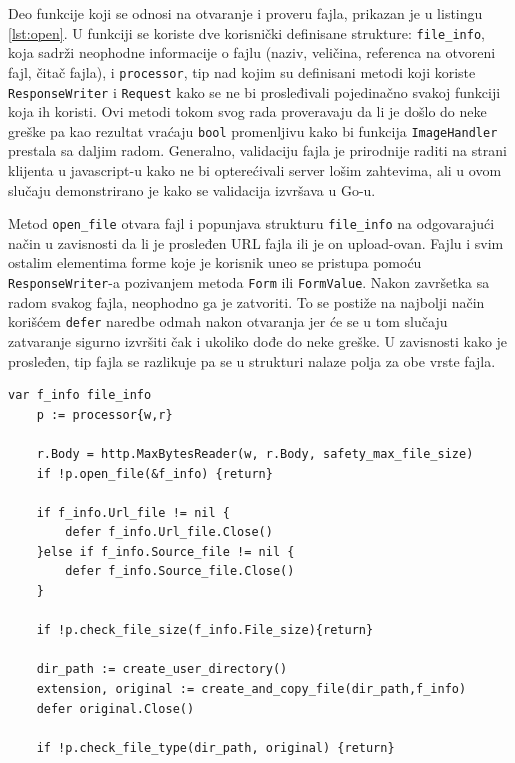 \documentclass[12pt,oneside]{memoir}
\begin{document}
Deo funkcije koji se odnosi na otvaranje i proveru fajla, prikazan je u listingu \ref{lst:open}. U funkciji se koriste dve korisnički definisane strukture: \texttt{file\_info}, koja sadrži neophodne informacije o fajlu (naziv, veličina, referenca na otvoreni fajl, čitač fajla), i \texttt{processor}, tip nad kojim su definisani metodi koji koriste \texttt{ResponseWriter} i \texttt{Request} kako se ne bi prosleđivali pojedinačno svakoj funkciji koja ih koristi. Ovi metodi tokom svog rada proveravaju da li je došlo do neke greške pa kao rezultat vraćaju \texttt{bool} promenljivu kako bi funkcija \texttt{ImageHandler} prestala sa daljim radom. Generalno, validaciju fajla je prirodnije raditi na strani klijenta u javascript-u kako ne bi opterećivali server lošim zahtevima, ali u ovom slučaju demonstrirano je kako se validacija izvršava u Go-u.

Metod \texttt{open\_file} otvara fajl i popunjava strukturu \texttt{file\_info} na odgovarajući način u zavisnosti da li je prosleđen URL fajla ili je on upload-ovan. Fajlu i svim ostalim elementima forme koje je korisnik uneo se pristupa pomoću \texttt{ResponseWriter}-a pozivanjem metoda \texttt{Form} ili \texttt{FormValue}. Nakon završetka sa radom svakog fajla, neophodno ga je zatvoriti. To se postiže na najbolji način korišćem \texttt{defer} naredbe odmah nakon otvaranja jer će se u tom slučaju zatvaranje sigurno izvršiti čak i ukoliko dođe do neke greške. U zavisnosti kako je prosleđen, tip fajla se razlikuje pa se u strukturi nalaze polja za obe vrste fajla. 


\begin{center}
\begin{lstlisting}[caption=Otvaranje i provera fajla u funkciji ImageHandler,label={lst:open},float,  backgroundcolor=\color{background}]
	var f_info file_info
	p := processor{w,r}

	r.Body = http.MaxBytesReader(w, r.Body, safety_max_file_size)
	if !p.open_file(&f_info) {return}

	if f_info.Url_file != nil {
		defer f_info.Url_file.Close()
	}else if f_info.Source_file != nil {
		defer f_info.Source_file.Close()
	}

	if !p.check_file_size(f_info.File_size){return}

	dir_path := create_user_directory()
	extension, original := create_and_copy_file(dir_path,f_info)
	defer original.Close()

	if !p.check_file_type(dir_path, original) {return}
\end{lstlisting}
\end{center}
\end{document}
